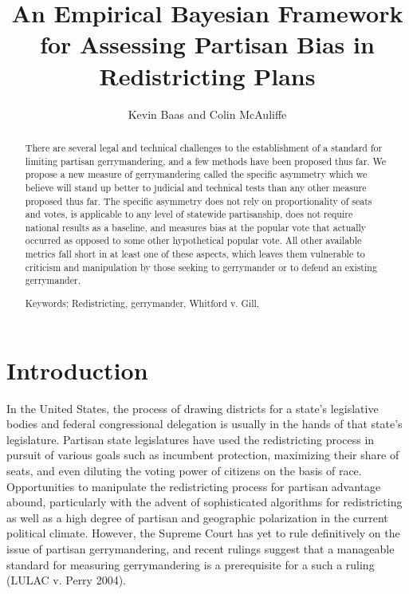 \documentclass[preprint,12pt]{article}
\begin{document}
\title{An Empirical Bayesian Framework for Assessing Partisan Bias in Redistricting Plans}

\author{Kevin Baas and Colin McAuliffe}

\maketitle

\begin{abstract}
There are several legal and technical challenges to the establishment of a standard for limiting partisan gerrymandering, and a few methods have been proposed thus far.
We propose a new measure of gerrymandering called the specific asymmetry which we believe will stand up better to judicial and technical tests than any other measure proposed thus far.
The specific asymmetry does not rely on proportionality of seats and votes, is applicable to any level of statewide partisanship, does not require national results as a baseline, and measures bias at the popular vote that actually occurred as opposed to some other hypothetical popular vote. 
All other available metrics fall short in at least one of these aspects, which leaves them vulnerable to criticism and manipulation by those seeking to gerrymander or to defend an existing gerrymander.


Keywords: Redistricting, gerrymander, Whitford v. Gill, 

\end{abstract}

\section{Introduction}
In the United States, the process of drawing districts for a state's legislative bodies and federal congressional delegation is usually in the hands of that state's legislature.
Partisan state legislatures have used the redistricting process in pursuit of various goals such as incumbent protection, maximizing their share of seats, and even diluting the voting power of citizens on the basis of race.
Opportunities to manipulate the redistricting process for partisan advantage abound, particularly with the advent of sophisticated algorithms for redistricting as well as a high degree of partisan and geographic polarization in the current political climate.
However, the Supreme Court has yet to rule definitively on the issue of partisan gerrymandering, and recent rulings suggest that a manageable standard for measuring gerrymandering is a prerequisite for a such a ruling (LULAC v. Perry 2004).
\end{document}
